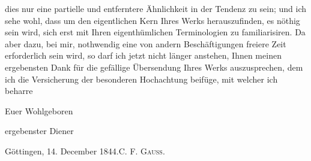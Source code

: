 \clearpage{}
\noindent dies nur eine partielle und entferntere Ähnlichkeit in der Tendenz zu sein; und ich sehe wohl, dass um den eigentlichen Kern Ihres Werks herauszufinden, es nöthig sein wird, sich erst mit Ihren eigenthümlichen Terminologien zu familiarisiren. Da aber dazu, bei mir, nothwendig eine von andern Beschäftigungen freiere Zeit erforderlich sein wird, so darf ich jetzt nicht länger anstehen, Ihnen meinen ergebensten Dank für die gefällige Übersendung Ihres Werks auszusprechen, dem ich die Versicherung der besonderen Hochachtung beifüge, mit welcher ich beharre
\par\noindent\hspace*{.54\linewidth}Euer Wohlgeboren
\par\noindent\hspace*{.62\linewidth}ergebenster Diener
\par\noindent\hspace*{\parindent}Göttingen, 14. December 1844.\hfill C. F. \textsc{Gauss}.\hspace*{.06\linewidth}
